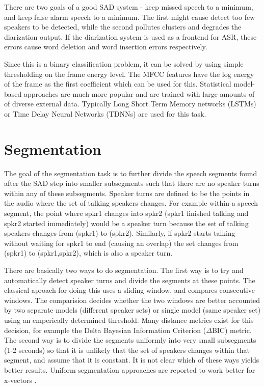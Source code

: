 There are two goals of a good SAD system - keep missed speech to a minimum, and keep false alarm speech to a minimum. The first might cause detect too few speakers to be detected, while the second pollutes clusters and degrades the diarization output. If the diarization system is used as a frontend for ASR, these errors cause word deletion and word insertion errors respectively.

Since this is a binary classification problem, it can be solved by using simple thresholding on the frame energy level. The MFCC features have the log energy of the frame as the first coefficient which can be used for this. Statistical model-based approaches are much more popular and are trained with large amounts of of diverse external data. Typically Long Short Term Memory networks (LSTMs) or Time Delay Neural Networks (TDNNs) are used for this task.

\section{Segmentation}

The goal of the segmentation task is to further divide the speech segments found after the SAD step into smaller subsegments such that there are no speaker turns within any of these subsegments. Speaker turns are defined to be the points in the audio where the set of talking speakers changes. For example within a speech segment, the point where spkr1 changes into spkr2 (spkr1 finished talking and spkr2 started immediately) would be a speaker turn because the set of talking speakers changes from (spkr1) to (spkr2). Similarly, if spkr2 starts talking without waiting for spkr1 to end (causing an overlap) the set changes from (spkr1) to (spkr1,spkr2), which is also a speaker turn.

There are basically two ways to do segmentation. The first way is to try and automatically detect speaker turns and divide the segments at these points. The classical aproach for doing this uses a sliding window, and compares consecutive windows.	The comparision decides whether the two windows are better accounted by two separate models (different speaker sets) or single model (same speaker set) using an emperically determined threshold. Many distance metrics exist for this decision, for example the Delta Bayesian Information Criterion ($\Delta$BIC) \cite{Chen1998SpeakerE} metric. The second way is to divide the segments uniformly into very small subsegments (1-2 seconds) so that it is unlikely that the set of speakers changes within that segment, and assume that it is constant. It is not clear which of these ways yields better results. Uniform segmentation approaches are reported to work better for x-vectors \cite{patino2018odessa}.

